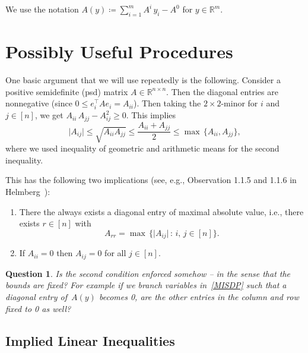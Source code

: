 \documentclass[10pt, a4paper]{article}
\newcommand{\suchthat}{\,:\,}
\newcommand{\abs}[1]{\lvert{#1}\rvert}
\newcommand{\define}{\coloneqq}
\newcommand{\T}{^{\top}}
\newcommand{\R}{\mathds{R}}
\newtheorem{question}[theorem]{Question}
\begin{document}
We use the notation $A(y) \define \sum_{i=1}^m A^i\, y_i - A^0$ for $y \in \R^m$.


\section{Possibly Useful Procedures}

One basic argument that we will use repeatedly is the following. Consider a
positive semidefinite (psd) matrix $A \in \R^{n \times n}$. Then the
diagonal entries are nonnegative (since $0 \leq e_i\T A e_i =
A_{ii}$). Then taking the $2 \times 2$-minor for $i$ and $j \in [n]$, we
get $A_{ii}\, A_{jj} - A_{ij}^2 \geq 0$. This implies
\begin{equation}\label{eq:TwoByTwoMinorInequality}
  \abs{A_{ij}} \leq \sqrt{A_{ii} A_{jj}} \leq \frac{A_{ii} + A_{jj}}{2} \leq \max\,\{A_{ii},
  A_{jj}\},
\end{equation}
where we used inequality of geometric and arithmetic means for the second inequality.

This has the following two implications (see, e.g., Observation 1.1.5 and
1.1.6 in Helmberg~\cite{Hel00}):
\begin{enumerate}
\item There the always exists a diagonal entry of maximal absolute value,
  i.e., there exists $r \in [n]$ with
  \[
    A_{rr} = \max\, \{\abs{A_{ij}} \suchthat i,\,j \in [n]\}.
  \]
\item If $A_{ii} = 0$ then $A_{ij} = 0$ for all $j \in [n]$.
\end{enumerate}

\begin{question}
  Is the second condition enforced somehow -- in the sense that the bounds
  are fixed? For example if we branch variables in~\eqref{MISDP} such that
  a diagonal entry of~$A(y)$ becomes 0, are the other entries in the column and row
  fixed to 0 as well?
\end{question}


\subsection{Implied Linear Inequalities}
\end{document}
